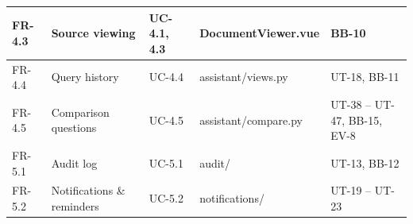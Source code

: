 \begin{table}[H]
\begin{tabularx}{\textwidth}{|p{1.3cm}|X|p{1.9cm}|p{3.4cm}|p{2.6cm}|}
FR-4.3 & Source viewing & UC-4.1, 4.3 & DocumentViewer.vue & BB-10 \\ \hline
FR-4.4 & Query history & UC-4.4 & assistant/views.py & UT-18, BB-11 \\ \hline
FR-4.5 & Comparison questions & UC-4.5 & assistant/compare.py & UT-38 -- UT-47, BB-15, EV-8 \\ \hline
FR-5.1 & Audit log & UC-5.1 & audit/ & UT-13, BB-12 \\ \hline
FR-5.2 & Notifications \& reminders & UC-5.2 & notifications/ & UT-19 -- UT-23 \\ \hline
\end{tabularx}
\end{table}
